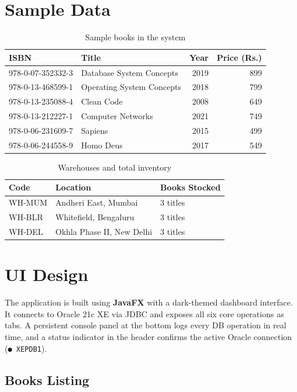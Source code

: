 \documentclass[12pt, a4paper]{article}
\begin{document}
\section{Sample Data}


\begin{table}[H]
\centering
\caption{Sample books in the system}
\begin{tabular}{llrr}
\toprule
\textbf{ISBN} & \textbf{Title} & \textbf{Year} & \textbf{Price (Rs.)} \\
\midrule
978-0-07-352332-3 & Database System Concepts & 2019 & 899 \\
978-0-13-468599-1 & Operating System Concepts & 2018 & 799 \\
978-0-13-235088-4 & Clean Code & 2008 & 649 \\
978-0-13-212227-1 & Computer Networks & 2021 & 749 \\
978-0-06-231609-7 & Sapiens & 2015 & 499 \\
978-0-06-244558-9 & Homo Deus & 2017 & 549 \\
\bottomrule
\end{tabular}
\end{table}

\begin{table}[H]
\centering
\caption{Warehouses and total inventory}
\begin{tabular}{lll}
\toprule
\textbf{Code} & \textbf{Location} & \textbf{Books Stocked} \\
\midrule
WH-MUM & Andheri East, Mumbai     & 3 titles \\
WH-BLR & Whitefield, Bengaluru    & 3 titles \\
WH-DEL & Okhla Phase II, New Delhi & 3 titles \\
\bottomrule
\end{tabular}
\end{table}


\section{UI Design}


The application is built using \textbf{JavaFX} with a dark-themed dashboard
interface. It connects to Oracle 21c XE via JDBC and exposes all six core
operations as tabs. A persistent console panel at the bottom logs every DB
operation in real time, and a status indicator in the header confirms the
active Oracle connection (\texttt{● XEPDB1}).

\subsection{Books Listing}
\end{document}
